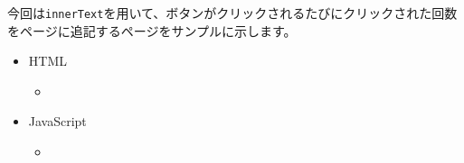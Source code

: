 今回は\texttt{innerText}を用いて、ボタンがクリックされるたびにクリックされた回数をページに追記するページをサンプルに示します。

\begin{itemize}
\item
  HTML

  \begin{itemize}
  \item
\begin{Shaded}
\begin{Highlighting}[]
    \DataTypeTok{\textgreater{}}
    \DataTypeTok{\textless{}}\OperatorTok{=}\DataTypeTok{\textgreater{}}
      \DataTypeTok{\textless{}}\DataTypeTok{\textgreater{}}
        \DataTypeTok{\textless{}}\OperatorTok{=}\OtherTok{ }\DataTypeTok{/\textgreater{}}
        \DataTypeTok{\textless{}}\OperatorTok{=}\OperatorTok{=}\OtherTok{ }\DataTypeTok{/\textgreater{}}
        \DataTypeTok{\textless{}}\DataTypeTok{\textgreater{}}\DataTypeTok{\textless{}/}\DataTypeTok{\textgreater{}}
        \DataTypeTok{\textless{}}\OperatorTok{=}\DataTypeTok{\textgreater{}\textless{}/}\DataTypeTok{\textgreater{}}
      \DataTypeTok{\textless{}/}\DataTypeTok{\textgreater{}}
      \DataTypeTok{\textless{}}\DataTypeTok{\textgreater{}}
        \DataTypeTok{\textless{}}\OperatorTok{=}\DataTypeTok{\textgreater{}}\DataTypeTok{\textless{}/}\DataTypeTok{\textgreater{}}
        \DataTypeTok{\textless{}}\OperatorTok{=}\DataTypeTok{\textgreater{}\textless{}/}\DataTypeTok{\textgreater{}}
      \DataTypeTok{\textless{}/}\DataTypeTok{\textgreater{}}
    \DataTypeTok{\textless{}/}\DataTypeTok{\textgreater{}}
\end{Highlighting}
\end{Shaded}
  \end{itemize}
\item
  JavaScript

  \begin{itemize}
  \item
\begin{Shaded}
\begin{Highlighting}[]
  \OperatorTok{=} \OperatorTok{;}


\end{Highlighting}
\end{Shaded}
\end{itemize}
\end{itemize}
